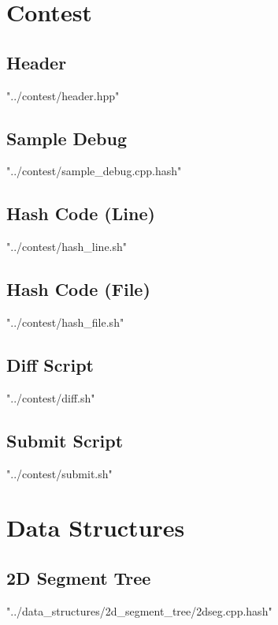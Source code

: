 \documentclass [12pt,onecolumn,oneside]{article}
\begin{document}
\pagestyle{fancy}
\fancyfoot{}
\fancyhead[R]{\thepage}
\renewcommand{\headrulewidth}{0.4pt}
\tableofcontents
\scriptsize


\newpage
\section{Contest}
\subsection{ Header}
 {"../contest/header.hpp"}
\newpage

\subsection{ Sample Debug}
 {"../contest/sample_debug.cpp.hash"}
\newpage

\subsection{ Hash Code (Line)}
 {"../contest/hash_line.sh"}

\subsection{ Hash Code (File)}
 {"../contest/hash_file.sh"}

\subsection{ Diff Script}
 {"../contest/diff.sh"}

\subsection{ Submit Script}
 {"../contest/submit.sh"}
\newpage

\section{Data Structures}
\subsection{ 2D Segment Tree}
 {"../data_structures/2d_segment_tree/2dseg.cpp.hash"}
\newpage
\end{document}
